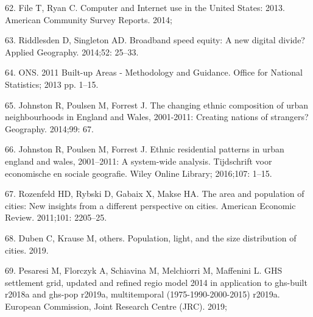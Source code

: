 \documentclass[10pt,letterpaper]{article}
\begin{document}
\leavevmode\hypertarget{ref-file_computer_2014}{}%
62. File T, Ryan C. Computer and Internet use in the United States:
2013. American Community Survey Reports. 2014;

\leavevmode\hypertarget{ref-riddlesden_broadband_2014}{}%
63. Riddlesden D, Singleton AD. Broadband speed equity: A new digital
divide? Applied Geography. 2014;52: 25--33.

\leavevmode\hypertarget{ref-ons2013}{}%
64. ONS. 2011 Built-up Areas - Methodology and Guidance. Office for
National Statistics; 2013 pp. 1--15.

\leavevmode\hypertarget{ref-johnston_changing_2014}{}%
65. Johnston R, Poulsen M, Forrest J. The changing ethnic composition of
urban neighbourhoods in England and Wales, 2001-2011: Creating nations
of strangers? Geography. 2014;99: 67.

\leavevmode\hypertarget{ref-johnston2016ethnic}{}%
66. Johnston R, Poulsen M, Forrest J. Ethnic residential patterns in
urban england and wales, 2001--2011: A system-wide analysis. Tijdschrift
voor economische en sociale geografie. Wiley Online Library; 2016;107:
1--15.

\leavevmode\hypertarget{ref-rozenfeld2011area}{}%
67. Rozenfeld HD, Rybski D, Gabaix X, Makse HA. The area and population
of cities: New insights from a different perspective on cities. American
Economic Review. 2011;101: 2205--25.

\leavevmode\hypertarget{ref-duben2019population}{}%
68. Duben C, Krause M, others. Population, light, and the size
distribution of cities. 2019.

\leavevmode\hypertarget{ref-pesaresi2019ghs}{}%
69. Pesaresi M, Florczyk A, Schiavina M, Melchiorri M, Maffenini L. GHS
settlement grid, updated and refined regio model 2014 in application to
ghs-built r2018a and ghs-pop r2019a, multitemporal (1975-1990-2000-2015)
r2019a. European Commission, Joint Research Centre (JRC). 2019;

\nolinenumbers
\end{document}
